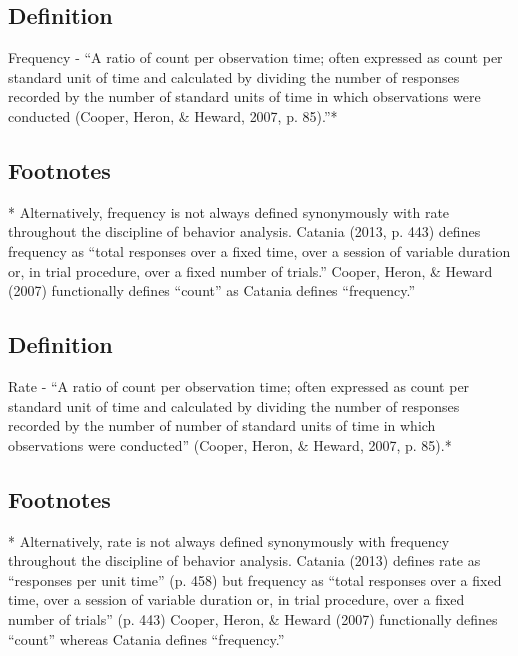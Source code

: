 \subsection{Definition}
Frequency - ``A ratio of count per observation time; often expressed as count per standard unit of time and calculated by dividing the number of responses recorded by the number of standard units of time in which observations were conducted (Cooper, Heron, \& Heward, 2007, p. 85).''*
%
\subsection{Footnotes}
* Alternatively, frequency is not always defined synonymously with rate throughout the discipline of behavior analysis. Catania (2013, p. 443) defines frequency as ``total responses over a fixed time, over a session of variable duration or, in trial procedure, over a fixed number of trials.'' Cooper, Heron, \& Heward (2007) functionally defines ``count'' as Catania defines ``frequency.''
%
%
%
\subsection{Definition}
Rate - ``A ratio of count per observation time; often expressed as count per standard unit of time and calculated by dividing the number of responses recorded by the number of number of standard units of time in which observations were conducted'' (Cooper, Heron, \& Heward, 2007, p. 85).*
%
\subsection{Footnotes}
* Alternatively, rate is not always defined synonymously with frequency throughout the discipline of behavior analysis. Catania (2013) defines rate as ``responses per unit time'' (p. 458) but frequency as ``total responses over a fixed time, over a session of variable duration or, in trial procedure, over a fixed number of trials'' (p. 443) Cooper, Heron, \& Heward (2007) functionally defines ``count'' whereas Catania defines ``frequency.''
%
